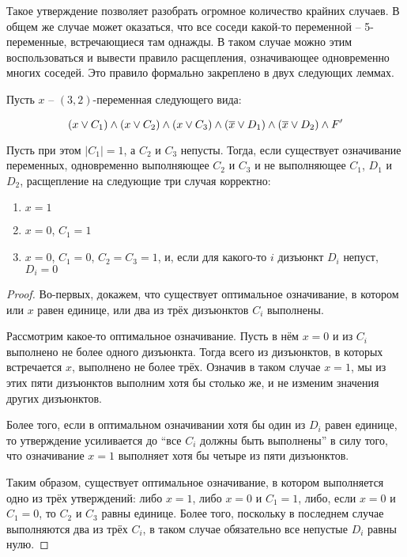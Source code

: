 Такое утверждение позволяет разобрать огромное количество крайних случаев. В общем же случае может оказаться, что все соседи какой-то переменной -- 5-переменные, встречающиеся там однажды. В таком случае можно этим воспользоваться и вывести правило расщепления, означивающее одновременно многих соседей. Это правило формально закреплено в двух следующих леммах.

\begin{lemma}
 Пусть $x$ -- $(3,2)$-переменная следующего вида:

 $$
  (x \vee C_1) \wedge (x \vee C_2) \wedge (x \vee C_3) \wedge (\overline{x} \vee D_1) \wedge (\overline{x} \vee D_2) \wedge F'
 $$

 Пусть при этом $|C_1| = 1$, а $C_2$ и $C_3$ непусты. Тогда, если существует означивание переменных, одновременно выполняющее $C_2$ и $C_3$ и не выполняющее $C_1$, $D_1$ и $D_2$, расщепление на следующие три случая корректно:

 \begin{enumerate}
  \item $x = 1$
  \item $x = 0$, $C_1 = 1$
  \item $x = 0$, $C_1 = 0$, $C_2 = C_3 = 1$, и, если для какого-то $i$ дизъюнкт $D_i$ непуст, $D_i = 0$
 \end{enumerate}

 \label{lemma:n5:3-cases}
\end{lemma}

\begin{proof}
 Во-первых, докажем, что существует оптимальное означивание, в котором или $x$ равен единице, или два из трёх дизъюнктов $C_i$ выполнены.

 Рассмотрим какое-то оптимальное означивание. Пусть в нём $x = 0$ и из $C_i$ выполнено не более одного дизъюнкта. Тогда всего из дизъюнктов, в которых встречается $x$, выполнено не более трёх. Означив в таком случае $x = 1$, мы из этих пяти дизъюнктов выполним хотя бы столько же, и не изменим значения других дизъюнктов.

 Более того, если в оптимальном означивании хотя бы один из $D_i$ равен единице, то утверждение усиливается до ``все $C_i$ должны быть выполнены'' в силу того, что означивание $x = 1$ выполняет хотя бы четыре из пяти дизъюнктов.

 Таким образом, существует оптимальное означивание, в котором выполняется одно из трёх утверждений: либо $x = 1$, либо $x = 0$ и $C_1 = 1$, либо, если $x = 0$ и $C_1 = 0$, то $C_2$ и $C_3$ равны единице. Более того, поскольку в последнем случае выполняются два из трёх $C_i$, в таком случае обязательно все непустые $D_i$ равны нулю.
\end{proof}

